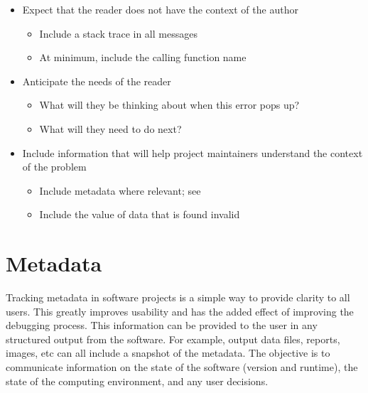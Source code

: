 \documentclass[]{nrel}
\begin{document}
\begin{itemize}

\item Expect that the reader does not have the context of the author
\begin{itemize}
\item Include a stack trace in all messages
\item At minimum, include the calling function name
\end{itemize}

\item Anticipate the needs of the reader
\begin{itemize}
\item What will they be thinking about when this error pops up?
\item What will they need to do next?
\end{itemize}

\item Include information that will help project maintainers understand the context of the problem
\begin{itemize}
\item Include metadata where relevant; see 
\item Include the value of data that is found invalid
\end{itemize}

\end{itemize}


\section{Metadata}
\label{sec:metadata}
Tracking metadata in software projects is a simple way to provide clarity to all users.
This greatly improves usability and has the added effect of improving the debugging process.
This information can be provided to the user in any structured output from the software.
For example, output data files, reports, images, etc can all include a snapshot of the metadata.
The objective is to communicate information on the state of the software (version and runtime),
the state of the computing environment, and any user decisions.
\end{document}
